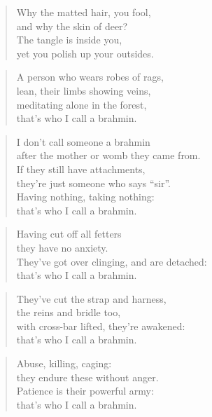 \documentclass[12pt,openany]{book}%
\begin{document}
\begin{verse}%
Why the matted hair, you fool, \\
and why the skin of deer? \\
The tangle is inside you, \\
yet you polish up your outsides. 

%
\end{verse}

\begin{verse}%
A person who wears robes of rags, \\
lean, their limbs showing veins, \\
meditating alone in the forest, \\
that’s who I call a brahmin. 

%
\end{verse}

\begin{verse}%
I don’t call someone a brahmin \\
after the mother or womb they came from. \\
If they still have attachments, \\
they’re just someone who says “sir”. \\
Having nothing, taking nothing: \\
that’s who I call a brahmin. 

%
\end{verse}

\begin{verse}%
Having cut off all fetters \\
they have no anxiety. \\
They’ve got over clinging, and are detached: \\
that’s who I call a brahmin. 

%
\end{verse}

\begin{verse}%
They’ve cut the strap and harness, \\
the reins and bridle too, \\
with cross-bar lifted, they’re awakened: \\
that’s who I call a brahmin. 

%
\end{verse}

\begin{verse}%
Abuse, killing, caging: \\
they endure these without anger. \\
Patience is their powerful army: \\
that’s who I call a brahmin. 

%
\end{verse}
\end{document}
